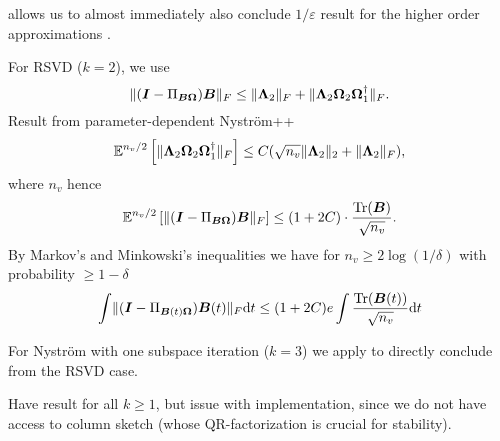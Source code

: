  allows us to almost immediately
also conclude $1/\varepsilon$ result for the higher order approximations
.

For RSVD ($k=2$), we use \cite[Theorem~9.1]{halko2011finding}
\begin{equation}
    \lVert (\boldsymbol{I} - \Pi_{\boldsymbol{B}\boldsymbol{\Omega}}) \boldsymbol{B} \rVert _F \leq \lVert \boldsymbol{\Lambda}_2 \rVert _F + \lVert \boldsymbol{\Lambda}_2 \boldsymbol{\Omega}_2 \boldsymbol{\Omega}_1^{\dagger} \rVert _F.
\end{equation}
Result from parameter-dependent Nyström++ 
\begin{equation}
    \mathbb{E}^{n_v/2} \left[ \lVert \mtx{\Lambda}_2 \mtx{\Omega}_2 \mtx{\Omega}_1^{\dagger} \rVert _F \right] \leq C(\sqrt{n_v} \lVert \mtx{\Lambda}_2 \rVert _2 + \lVert \mtx{\Lambda}_2 \rVert _F),%
\end{equation}
where $n_v$ hence
\begin{equation}
    \mathbb{E}^{n_v/2} \left[ \lVert (\boldsymbol{I} - \Pi_{\boldsymbol{B}\boldsymbol{\Omega}}) \boldsymbol{B} \rVert _F \right]
    \leq (1 + 2C) \cdot \frac{\operatorname{Tr}(\boldsymbol{B})}{\sqrt{n_v}}.
\end{equation}
By Markov's and Minkowski's inequalities we have for $n_v \geq 2 \log(1/\delta)$ with probability $\geq 1 - \delta$
\begin{equation}
    \int \lVert  (\boldsymbol{I} - \Pi_{\boldsymbol{B}(t)\boldsymbol{\Omega}}) \boldsymbol{B}(t) \rVert _F \mathrm{d}t \leq (1 + 2C) e \int \frac{\operatorname{Tr}(\boldsymbol{B}(t))}{\sqrt{n_v}} \mathrm{d}t
\end{equation}

For Nystr\"om with one subspace iteration ($k=3$) we apply \cite[Lemma~5.2]{tropp2023randomized}
to directly conclude from the RSVD case.

Have result for all $k \geq 1$, but issue with implementation, since we do not
have access to column sketch (whose QR-factorization is crucial for stability).

